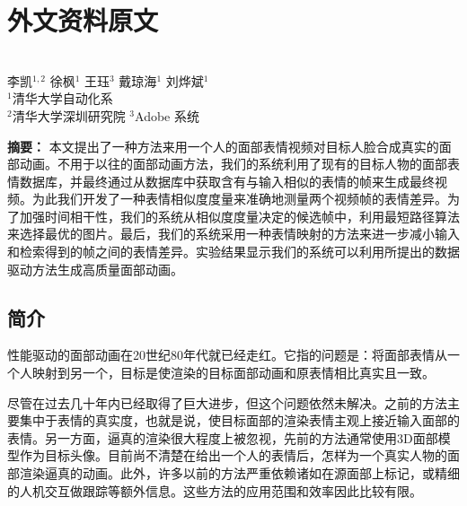 
\chapter{外文资料原文}
\begin{center}
\\
\vspace{10pt}
\wuhao
李凯$^{1,2}$ \text{~~~~} 徐枫$^{1}$ \text{~~~~}王珏$^{3}$ \text{~~~~}戴琼海$^{1}$ \text{~~~~}刘烨斌$^{1}$\\
$^{1}$清华大学自动化系\\
$^{2}$清华大学深圳研究院\text{~~~}
$^{3}$Adobe 系统\\
\end{center}

\textbf{摘要：}
本文提出了一种方法来用一个人的面部表情视频对目标人脸合成真实的面部动画。不用于以往的面部动画方法，我们的系统利用了现有的目标人物的面部表情数据库，并最终通过从数据库中获取含有与输入相似的表情的帧来生成最终视频。为此我们开发了一种表情相似度度量来准确地测量两个视频帧的表情差异。为了加强时间相干性，我们的系统从相似度度量决定的候选帧中，利用最短路径算法来选择最优的图片。最后，我们的系统采用一种表情映射的方法来进一步减小输入和检索得到的帧之间的表情差异。实验结果显示我们的系统可以利用所提出的数据驱动方法生成高质量面部动画。

\section{简介}
性能驱动的面部动画在20世纪80年代就已经走红。它指的问题是：将面部表情从一个人映射到另一个，目标是使渲染的目标面部动画和原表情相比真实且一致。

尽管在过去几十年内已经取得了巨大进步，但这个问题依然未解决。之前的方法主要集中于表情的真实度，也就是说，使目标面部的渲染表情主观上接近输入面部的表情。另一方面，逼真的渲染很大程度上被忽视，先前的方法通常使用3D面部模型作为目标头像。目前尚不清楚在给出一个人的表情后，怎样为一个真实人物的面部渲染逼真的动画。此外，许多以前的方法严重依赖诸如在源面部上标记\cite{feature_based, eri}，或精细的人机交互做跟踪\cite{performance_driven, drawing}等额外信息。这些方法的应用范围和效率因此比较有限。

